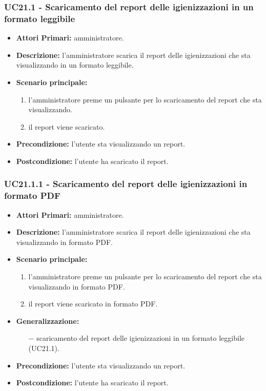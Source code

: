 \subsubsection{ UC21.1 - Scaricamento del report delle igienizzazioni in un formato leggibile}
\begin{itemize}
	\item\textbf{Attori Primari:} 
	amministratore.
	\item\textbf{Descrizione:} 
	l'amministratore scarica il report delle igienizzazioni che sta visualizzando in un formato leggibile.
	\item\textbf{Scenario principale:} 
	\begin{enumerate}
		\item l'amministratore preme un pulsante per lo scaricamento del report che sta visualizzando.
		\item il report viene scaricato.
	\end{enumerate}
	\item\textbf{Precondizione:} 
	l'utente sta visualizzando un report.
	\item\textbf{Postcondizione:}
	l'utente ha scaricato il report.
\end{itemize}

\subsubsection{ UC21.1.1 - Scaricamento del report delle igienizzazioni in formato PDF}
\begin{itemize}
	\item\textbf{Attori Primari:} 
	amministratore.
	\item\textbf{Descrizione:} 
	l'amministratore scarica il report delle igienizzazioni che sta visualizzando in formato PDF.
	\item\textbf{Scenario principale:} 
	\begin{enumerate}
		\item l'amministratore preme un pulsante per lo scaricamento del report che sta visualizzando in formato PDF.
		\item il report viene scaricato in formato PDF.
	\end{enumerate}
	\item\textbf{Generalizzazione:}
	\begin{itemize}
		\item[$-$] scaricamento del report delle igienizzazioni in un formato leggibile (UC21.1).
	\end{itemize}
	\item\textbf{Precondizione:} 
	l'utente sta visualizzando un report.
	\item\textbf{Postcondizione:}
	l'utente ha scaricato il report.
\end{itemize}

